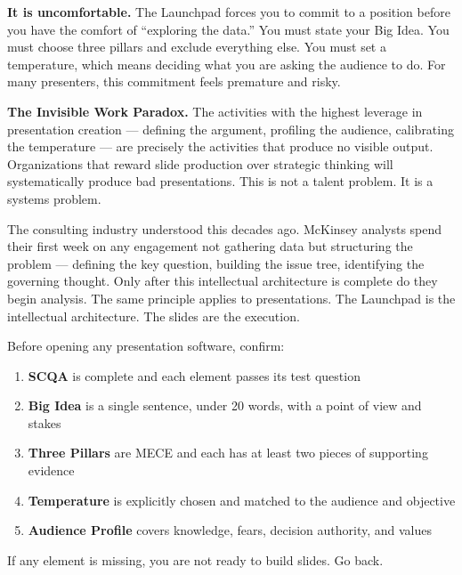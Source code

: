 \textbf{It is uncomfortable.} The Launchpad forces you to commit to a position before you have the comfort of ``exploring the data.'' You must state your Big Idea. You must choose three pillars and exclude everything else. You must set a temperature, which means deciding what you are asking the audience to do. For many presenters, this commitment feels premature and risky.

\begin{diagnosisbox}
\textbf{The Invisible Work Paradox.} The activities with the highest leverage in presentation creation --- defining the argument, profiling the audience, calibrating the temperature --- are precisely the activities that produce no visible output. Organizations that reward slide production over strategic thinking will systematically produce bad presentations. This is not a talent problem. It is a systems problem.
\end{diagnosisbox}

The consulting industry understood this decades ago. McKinsey analysts spend their first week on any engagement not gathering data but structuring the problem --- defining the key question, building the issue tree, identifying the governing thought. Only after this intellectual architecture is complete do they begin analysis. The same principle applies to presentations. The Launchpad is the intellectual architecture. The slides are the execution.

\begin{keybox}
Before opening any presentation software, confirm:
\begin{enumerate}[leftmargin=1.5em]
  \item \textbf{SCQA} is complete and each element passes its test question
  \item \textbf{Big Idea} is a single sentence, under 20 words, with a point of view and stakes
  \item \textbf{Three Pillars} are MECE and each has at least two pieces of supporting evidence
  \item \textbf{Temperature} is explicitly chosen and matched to the audience and objective
  \item \textbf{Audience Profile} covers knowledge, fears, decision authority, and values
\end{enumerate}
If any element is missing, you are not ready to build slides. Go back.
\end{keybox}

